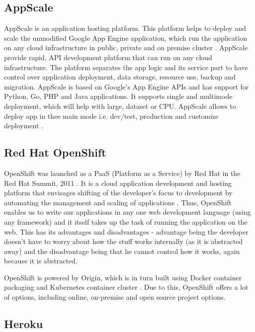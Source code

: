 \subsection{AppScale}

    AppScale is an application hosting platform. This platform helps
    to deploy and scale the unmodified Google App Engine application,
    which run the application on any cloud infrastructure in public,
    private and on premise cluster \cite{www-appscale}. AppScale
    provide rapid, API development platform that can run on any cloud
    infrastructure. The platform separates the app logic and its
    service part to have control over application deployment, data
    storage, resource use, backup and migration.  AppScale is based on
    Google’s App Engine APIs and has support for Python, Go, PHP and
    Java applications. It supports single and multimode deployment,
    which will help with large, dataset or CPU. AppScale allows to
    deploy app in thee main mode i.e. dev/test, production and
    customize deployment \cite{www-appscale-deployment}.

\subsection{Red Hat OpenShift}

    OpenShift was launched as a PaaS (Platform as a
    Service) by Red Hat in the Red Hat Summit, 2011 \cite{www-paas-openshift}.
    It is a cloud application development and hosting platform that 
    envisages shifting of the developer's focus to development by 
    automating the management and scaling of applications 
    \cite{www-developers-openshift}.  Thus, OpenShift \cite{www-openshift} 
    enables us to write our applications in any one web development
    language (using any framework) and it itself takes up the task of
    running the application on the web.  This has its advantages and
    disadvantages - advantage being the developer doesn't have to
    worry about how the stuff works internally (as it is abstracted
    away) and the disadvantage being that he cannot control how it
    works, again because it is abstracted.

    OpenShift is powered by Origin, which is in turn built using 
    Docker container packaging and Kubernetes container cluster 
    \cite{www-openshift-blog}.  Due to this, OpenShift offers a lot of
    options, including online, on-premise and open source project
    options.
    
\subsection{Heroku}

